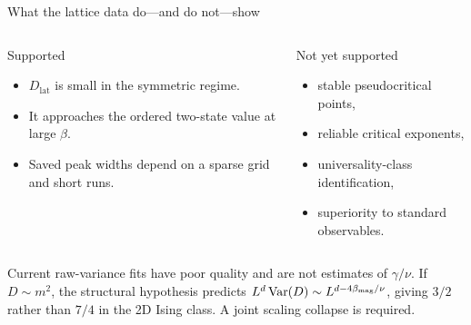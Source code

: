 \begin{frame}{What the lattice data do—and do not—show}
  \begin{columns}[T]
      \begin{block}{Supported}
        \begin{itemize}
          \item $D_{\mathrm{lat}}$ is small in the symmetric regime.
          \item It approaches the ordered two-state value at large $\beta$.
          \item Saved peak widths depend on a sparse grid and short runs.
        \end{itemize}
      \end{block}
      \begin{alertblock}{Not yet supported}
        \begin{itemize}
          \item stable pseudocritical points,
          \item reliable critical exponents,
          \item universality-class identification,
          \item superiority to standard observables.
        \end{itemize}
      \end{alertblock}
  \end{columns}

  Current raw-variance fits have poor quality and are not estimates of
  $\gamma/\nu$. If $D\sim m^2$, the structural hypothesis predicts
  $L^d\operatorname{Var}(D)\sim L^{d-4\beta_{\rm mag}/\nu}$, giving $3/2$
  rather than $7/4$ in the 2D Ising class. A joint scaling collapse is required.
\end{frame}
